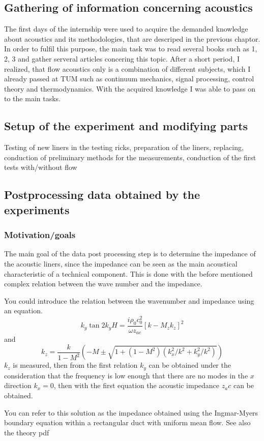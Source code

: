 \documentclass{article}
\begin{document}
\subsection{Gathering of information concerning acoustics } 
The first days of the internship were used to acquire the demanded knowledge about acoustics and its methodologies, that are descriped in the previous chaptor.
In order to fulfil this purpose, the main task was to read several books such as 1, 2, 3 and gather serveral articles concering this topic.
After a short period, I realized, that flow acoustics only is a combination of different subjects, which I already passed at TUM such as continuum mechanics, signal processing, control theory and thermodynamics.
With the acquired knowledge I was able to pass on to the main tasks. 
\subsection{Setup of the experiment and modifying parts}
Testing of new liners in the testing ricks, preparation of the liners, replacing, conduction of preliminary methods for the measurements, conduction of the first tests with/without flow

\subsection{Postprocessing data obtained by the experiments}

\subsubsection{Motivation/goals}
The main goal of the data post processing step is to determine the impedance of the acoustic liners, since the impedance can be seen as the main acoustical characteristic of a technical component.
This is done with the before mentioned complex relation between the wave number and the impedance.

{\color{red} You could introduce the relation between the wavenumber and impedance using an equation.
\begin{equation}
    k_y \tan 2k_y H = \frac{i \rho_0 c_0^2}{\omega z_{ac}} \left[k-M_zk_z\right]^2
\end{equation}
and
\begin{equation}
    k_z = \frac{k}{1-M^2} \left( -M \pm \sqrt{1+(1-M^2)(k_x^2/k^2 + k_y^2/k^2)}\right)    
\end{equation}
$k_z$ is measured, then from the first relation $k_y$ can be obtained under the consideration that the frequency is low enough that there are no modes in the $x$ direction $k_x = 0$, then with the first equation the acoustic impedance $z_ac$ can be obtained.

You can refer to this solution as the impedance obtained using the Ingmar-Myers boundary equation within a rectangular duct with uniform mean flow. See also the theory pdf}
\end{document}
